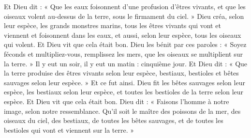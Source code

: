 Et Dieu dit :
	« Que les eaux foisonnent d’une profusion d’êtres vivants,
	et que les oiseaux volent au-dessus de la terre,
	sous le firmament du ciel. »
Dieu créa, selon leur espèce, les grands monstres marins,
	tous les êtres vivants qui vont et viennent et foisonnent dans les eaux,
	et aussi, selon leur espèce, tous les oiseaux qui volent.
	Et Dieu vit que cela était bon.
Dieu les bénit par ces paroles : « Soyez féconds et multipliez-vous,
	remplissez les mers, que les oiseaux se multiplient sur la terre. »
Il y eut un soir, il y eut un matin : cinquième jour.
Et Dieu dit : « Que la terre produise des êtres vivants selon leur espèce,
	bestiaux, bestioles et bêtes sauvages selon leur espèce. »
	Et ce fut ainsi.
Dieu fit les bêtes sauvages selon leur espèce, les bestiaux selon leur espèce,
	et toutes les bestioles de la terre selon leur espèce. 
Et Dieu vit que cela était bon.
Dieu dit : « Faisons l’homme à notre image, selon notre ressemblance.
Qu’il soit le maître des poissons de la mer, des oiseaux du ciel,
	des bestiaux, de toutes les bêtes sauvages, 
	et de toutes les bestioles qui vont et viennent sur la terre. »
